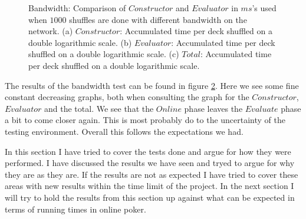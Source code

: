 \documentclass[twoside,11pt,openright]{report}
\begin{document}
\begin{figure}
    \begin{subfigure}{\textwidth}
        \centering
        \caption{}
        \label{fig:total_bandwith_plot}
    \end{subfigure}
    \caption{Bandwidth: Comparison of $Constructor$ and $Evaluator$ in $ms$'s used when $1000$ shuffles are done with different bandwidth on the network. (a) $Constructor$: Accumulated time per deck shuffled on a double logarithmic scale. (b) $Evaluator$: Accumulated time per deck shuffled on a double logarithmic scale. (c) $Total$: Accumulated time per deck shuffled on a double logarithmic scale.}
    \label{fig:mesurement_bandwith}
\end{figure}

The results of the bandwidth test can be found in figure \ref{fig:mesurement_bandwith}. Here we see some fine constant decreasing graphs, both when consulting the graph for the $Constructor$, $Evaluator$ and the total. We see that the $Online$ phase leaves the $Evaluate$ phase a bit to come closer again. This is most probably do to the uncertainty of the testing environment. Overall this follows the expectations we had.

\bigskip

In this section I have tried to cover the tests done and argue for how they were performed. I have discussed the results we have seen and tryed to argue for why they are as they are. If the results are not as expected I have tried to cover these areas with new results within the time limit of the project. In the next section I will try to hold the results from this section up against what can be expected in terms of running times in online poker.
\end{document}
